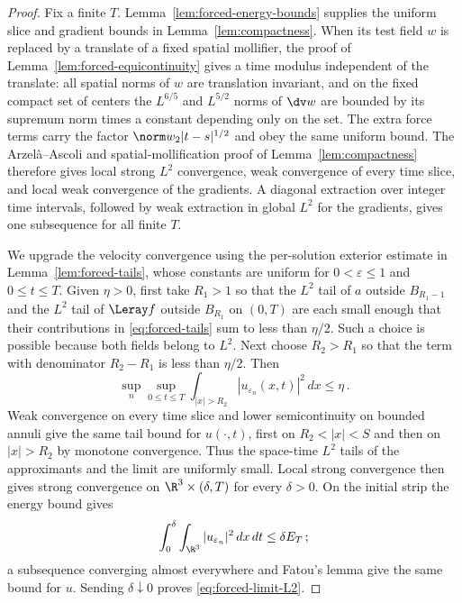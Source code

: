 \documentclass[11pt,reqno]{amsart}
\begin{document}
\begin{proof}
Fix a finite $T$. Lemma~\ref{lem:forced-energy-bounds} supplies the uniform
slice and gradient bounds in Lemma~\ref{lem:compactness}. When its test
field $w$ is replaced by a translate of a fixed spatial mollifier, the
proof of Lemma~\ref{lem:forced-equicontinuity} gives a time modulus
independent of the translate: all spatial norms of $w$ are translation
invariant, and on the fixed compact set of centers the $L^{6/5}$ and
$L^{5/2}$ norms of $\dv w$ are bounded by its supremum norm times a
constant depending only on the set. The extra force terms carry the
factor $\norm w_2|t-s|^{1/2}$ and obey the same uniform bound. The
Arzel\`a--Ascoli and spatial-mollification proof of
Lemma~\ref{lem:compactness} therefore gives local strong $L^2$ convergence,
weak convergence of every time slice, and local weak convergence of the
gradients. A diagonal extraction over integer time intervals, followed by
weak extraction in global $L^2$ for the gradients, gives one subsequence
for all finite $T$.

We upgrade the velocity convergence using the per-solution exterior estimate in Lemma~\ref{lem:forced-tails}, whose constants are uniform for $0<\varepsilon\le1$ and $0\le t\le T$.
Given $\eta>0$, first take $R_1>1$ so that the $L^2$ tail of $a$ outside
$B_{R_1-1}$ and the $L^2$ tail of $\Leray f$ outside $B_{R_1}$ on
$(0,T)$ are each small enough that their contributions in
\eqref{eq:forced-tails} sum to less than $\eta/2$. Such a choice is
possible because both fields belong to $L^2$. Next choose $R_2>R_1$ so
that the term with denominator $R_2-R_1$ is less than $\eta/2$. Then
\[
 \sup_n\sup_{0\le t\le T}\int_{|x|>R_2}|u_{\varepsilon_n}(x,t)|^2\,dx
 \le\eta\,.
\]
Weak convergence on every time slice and lower semicontinuity on bounded
annuli give the same tail bound for $u(\cdot,t)$, first on
$R_2<|x|<S$ and then on $|x|>R_2$ by monotone convergence. Thus the
space-time $L^2$ tails of the approximants and the limit are uniformly
small. Local strong convergence then gives strong convergence on
$\R^3\times(\delta,T)$ for every $\delta>0$. On the initial strip the
energy bound gives
\[
 \int_0^\delta\int_{\R^3}|u_{\varepsilon_n}|^2\,dx\,dt
 \le \delta E_T\,;
\]
a subsequence converging almost everywhere and Fatou's lemma give the same
bound for $u$. Sending $\delta\downarrow0$ proves
\eqref{eq:forced-limit-L2}.


\end{proof}
\end{document}
